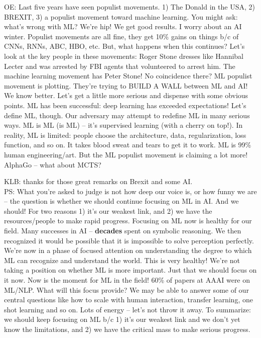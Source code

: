 OE: Last five years have seen populist movements. 1) The Donald in the USA, 2) BREXIT, 3) a populist movement toward machine learning. You might ask: what's wrong with ML? We're hip! We get good results. I worry about an AI winter. Populist movements are all fine, they get 10\% gains on things b/c of CNNs, RNNs, ABC, HBO, etc. But, what happens when this continues? Let's look at the key people in these movements: Roger Stone dresses like Hannibal Lecter and was arrested by FBI agents that volunteered to arrest him. The machine learning movement has Peter Stone! No coincidence there? ML populist movement is plotting. They're trying to BUILD A WALL between ML and AI! We know better. Let's get a little more serious and dispense with some obvious points. ML has been successful: deep learning has exceeded expectations! Let's define ML, though. Our adversary may attempt to redefine ML in many serious ways. ML is ML (is ML) -- it's supervised learning (with a cherry on top!). In reality, ML is limited: people choose the architecture, data, regularization, loss function, and so on. It takes blood sweat and tears to get it to work. ML is 99\% human engineering/art. But the ML populist movement is claiming a lot more! AlphaGo -- what about MCTS?

KLB: thanks for those great remarks on Brexit and some AI. \\

PS: What you're asked to judge is not how deep our voice is, or how funny we are -- the question is whether we should continue focusing on ML in AI. And we should! For two reasons 1) it's our weakest link, and 2) we have the resources/people to make rapid progress. Focusing on ML now is healthy for our field. Many successes in AI -- {\bf decades} spent on symbolic reasoning. We then recognized it would be possible that it is impossible to solve perception perfectly. We're now in a phase of focused attention on understanding the degree to which ML can recognize and understand the world. This is very healthy! We're not taking a position on whether ML is more important. Just that we should focus on it now. Now is the moment for ML in the field! 60\% of papers at AAAI were on ML/NLP. What will this focus provide? We may be able to answer some of our central questions like how to scale with human interaction, transfer learning, one shot learning and so on. Lots of energy -- let's not throw it away. To summarize: we should keep focusing on ML b/c 1) it's our weakest link and we don't yet know the limitations, and 2) we have the critical mass to make serious progress. \\

